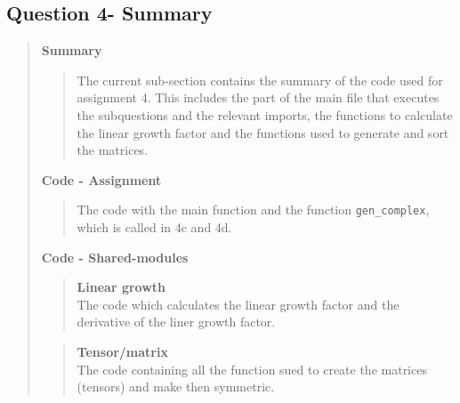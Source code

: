 
\subsection*{\textbf{Question 4- Summary}}
\begin{quote}

\textbf{Summary}
\begin{quote}
The current sub-section contains the summary of the code used for assignment 4. This includes the part of the main file that executes the subquestions and the relevant imports, the functions to calculate the linear growth factor and the functions used to generate and sort the matrices.

\end{quote}


\textbf{Code - Assignment}

\begin{quote}
The code with the main function and the function \texttt{gen\_complex}, which is called in 4c and 4d. 
\label{CODE:MAIN4}

\end{quote}

\newpage
\textbf{Code - Shared-modules} \\
\begin{quote}
\textbf{Linear growth} \\
The code which calculates the linear growth factor and the derivative of the liner growth factor.
\label{CODE:h4}

\end{quote}

\begin{quote}
\textbf{Tensor/matrix} \\
The code containing all the function sued to create the matrices (tensors) and make then symmetric.  

\label{CODE:misc}
\end{quote}
\end{quote}

\newpage

%

%


%
\newpage












